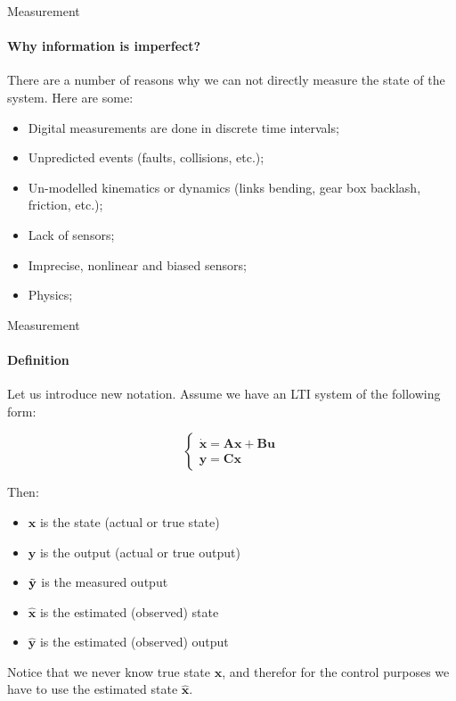 \documentclass{beamer}
\begin{document}
\begin{frame}{Measurement}
\framesubtitle{Why information is imperfect?}
\begin{flushleft}

There are a number of reasons why we can not directly measure the state of the system. Here are some:

\begin{itemize}
\item Digital measurements are done in discrete time intervals;
\item Unpredicted events (faults, collisions, etc.);
\item Un-modelled kinematics or dynamics (links bending, gear box backlash,  friction, etc.);
\item Lack of sensors;
\item Imprecise, nonlinear and biased sensors;
\item Physics;
\end{itemize}

\end{flushleft}
\end{frame}

\begin{frame}{Measurement}
\framesubtitle{Definition}
\begin{flushleft}

Let us introduce new notation. Assume we have an LTI system of the following form:

\[
\begin{cases}
\dot {\mathbf x} = \mathbf A \mathbf x + \mathbf B \mathbf u\\
\mathbf y = \mathbf C \mathbf x
\end{cases}
\]

Then:

\begin{itemize}
\item $\mathbf x$ is the state (actual or true state)
\item $\mathbf y$ is the output (actual or true output)
\item $\Tilde{\mathbf y}$ is the measured output
\item $\hat{\mathbf x}$ is the estimated (observed) state
\item $\hat{\mathbf y}$ is the estimated (observed) output
\end{itemize}

Notice that we never know true state $\mathbf x$, and therefor for the control purposes we have to use the estimated state $\hat{\mathbf x}$.

\end{flushleft}
\end{frame}
\end{document}
